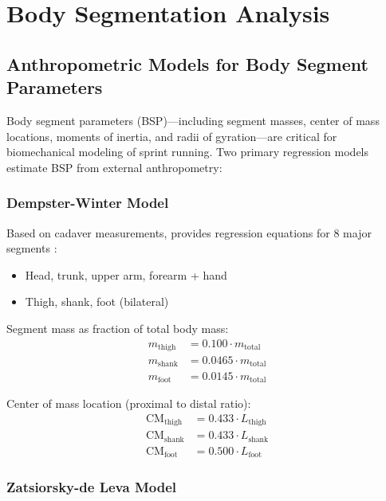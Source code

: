 \section{Body Segmentation Analysis}

\subsection{Anthropometric Models for Body Segment Parameters}

Body segment parameters (BSP)—including segment masses, center of mass locations, moments of inertia, and radii of gyration—are critical for biomechanical modeling of sprint running. Two primary regression models estimate BSP from external anthropometry:

\subsubsection{Dempster-Winter Model}

Based on cadaver measurements, provides regression equations for 8 major segments \citep{Winter2009}:
\begin{itemize}
    \item Head, trunk, upper arm, forearm + hand
    \item Thigh, shank, foot (bilateral)
\end{itemize}

Segment mass as fraction of total body mass:
\begin{align}
m_{\text{thigh}} &= 0.100 \cdot m_{\text{total}} \\
m_{\text{shank}} &= 0.0465 \cdot m_{\text{total}} \\
m_{\text{foot}} &= 0.0145 \cdot m_{\text{total}}
\end{align}

Center of mass location (proximal to distal ratio):
\begin{align}
\text{CM}_{\text{thigh}} &= 0.433 \cdot L_{\text{thigh}} \\
\text{CM}_{\text{shank}} &= 0.433 \cdot L_{\text{shank}} \\
\text{CM}_{\text{foot}} &= 0.500 \cdot L_{\text{foot}}
\end{align}

\subsubsection{Zatsiorsky-de Leva Model}

